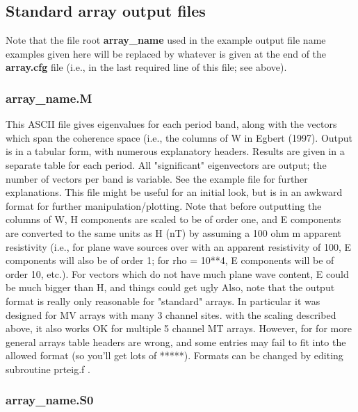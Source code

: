 \subsection{Standard array output files}

Note that the file root {\bf array\_name} used in the example output file name
examples given here will be replaced by whatever is given at the end
of the {\bf array.cfg} file (i.e., in the last required line of this file; see
above).

\subsubsection{array\_name.M}

This ASCII file gives eigenvalues for each period band,
along with the vectors which span the coherence space (i.e., the
columns of W in Egbert (1997).  Output is in a tabular form, with numerous
explanatory headers.  Results are given in a separate
table for each period.   All "significant" eigenvectors are output;
the number of vectors per band is variable.  See the example file
for further explanations. This file might be useful for an initial look,
but is in an awkward format for further manipulation/plotting.
Note that before outputting the columns of W, H components are scaled to
be of order one, and E components are converted to the same units as H (nT)
by assuming a 100 ohm m apparent resistivity (i.e., for plane wave sources
over with an apparent resistivity of 100, E components will also be of order 1;
for rho = 10**4, E components will be of order 10, etc.).  For vectors which
do not have much plane wave content, E could be much bigger than H, and things
could get ugly  Also, note that the output format is really only reasonable for "standard"
arrays.  In particular it was designed for MV arrays with many 3 channel sites.
with the scaling described above, it also works OK for multiple 5 channel MT arrays.
However, for for more general arrays table headers are wrong, and some entries
may fail to fit into the allowed format (so you'll get lots of *****).  
Formats can be changed by editing subroutine prteig.f .

\subsubsection{array\_name.S0}

